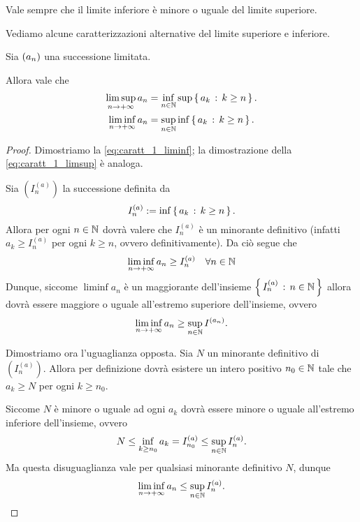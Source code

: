 \begin{remark}
    Vale sempre che il limite inferiore è minore o uguale del limite superiore.
\end{remark}

Vediamo alcune caratterizzazioni alternative del limite superiore e inferiore.

\begin{proposition} 
    \label{prop:caratt_1_limsupinf}
    Sia $\seqn*{a}$ una successione limitata.
    
    Allora vale che \begin{align}
        \limsup_{n \to +\infty} a_n &= \inf_{n \in \mathbb{N}} \sup \left\{\,a_k \,:\, k \geq n\,\right\}.\label{eq:caratt_1_limsup}\\
        \liminf_{n \to +\infty} a_n &= \sup_{n \in \mathbb{N}} \inf \left\{\,a_k \,:\, k \geq n\,\right\}.\label{eq:caratt_1_liminf}
    \end{align}
\end{proposition}
\begin{proof}
    Dimostriamo la \eqref{eq:caratt_1_liminf}; la dimostrazione della \eqref{eq:caratt_1_limsup} è analoga.

    Sia $\left( I^{(a)}_n \right)$ la successione definita da \[
        I^{(a)}_n := \inf \left\{\,a_k \,:\, k \geq n\,\right\}.
    \] Allora per ogni $n \in \mathbb{N}$ dovrà valere che $I^{(a)}_n$ è un minorante definitivo (infatti $a_k \geq I^{(a)}_n$ per ogni $k \geq n$, ovvero definitivamente).
    Da ciò segue che \[
        \liminf_{n\to +\infty} a_n \geq I^{(a)}_n \quad \forall n \in \mathbb{N}    
    \] Dunque, siccome $\liminf a_n$ è un maggiorante dell'insieme $\left\{\,I^{(a)}_n\,:\, n \in \mathbb{N}\,\right\}$ allora dovrà essere maggiore o uguale all'estremo superiore dell'insieme, ovvero \[
        \liminf_{n \to +\infty} a_n \geq \sup_{n \in \mathbb{N}} I^{(a_n)}.    
    \]

    Dimostriamo ora l'uguaglianza opposta.
    Sia $N$ un minorante definitivo di $\left( I^{(a)}_n \right)$. Allora per definizione dovrà esistere un intero positivo $n_0 \in \mathbb{N}$ tale che $a_k \geq N$ per ogni $k \geq n_0$. 
    
    Siccome $N$ è minore o uguale ad ogni $a_k$ dovrà essere minore o uguale all'estremo inferiore dell'insieme, ovvero \[
        N \leq \inf_{k \geq n_0} a_k = I^{(a)}_{n_0} \leq \sup_{n \in \mathbb{N}} I^{(a)}_n.
    \] Ma questa disuguaglianza vale per qualsiasi minorante definitivo $N$, dunque \[
        \liminf_{n \to +\infty} a_n \leq \sup_{n \in \mathbb{N}} I^{(a)}_n.    \qedhere
    \]
\end{proof}


